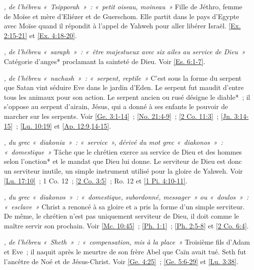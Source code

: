 \begin{multicols}{2}
\textit{, de l'hébreu «~Tsipporah~»~: «~petit oiseau, moineau~»}\newline
Fille de Jéthro, femme de Moïse et mère d'Eliézer et de Guerschom. Elle partit dans le pays d'Egypte avec Moïse quand il répondit à l'appel de Yahweh pour aller libérer Israël. \vref{Ex. 2:15-21} et \vref{Ex. 4:18-20}.

\textit{, de l'hébreu «~saraph~»~: «~être majestueux avec six ailes au service de Dieu~»}\newline
Catégorie d'anges* proclamant la sainteté de Dieu. Voir \vref{Es. 6:1-7}.

\textit{, de l'hébreu «~nachash~»~: «~serpent, reptile~»}\newline
C'est sous la forme du serpent que Satan vint séduire Eve dans le jardin d'Eden. Le serpent fut maudit d'entre tous les animaux pour son action. Le serpent ancien ou rusé désigne le diable*~; il s'oppose au serpent d'airain, Jésus, qui a donné à ses enfants le pouvoir de marcher sur les serpents.\newline
Voir \vref{Ge. 3:1-14}~; \vref{No. 21:4-9}~; \vref{2 Co. 11:3}~; \vref{Jn. 3:14-15}~; \vref{Lu. 10:19} et \vref{Ap. 12:9,14-15}.

\textit{, du grec «~diakonia~»~: «~service~», dérivé du mot grec «~diakonos~»~: «~domestique~»}\newline
Tâche que le chrétien exerce au service de Dieu et des hommes selon l'onction* et le mandat que Dieu lui donne. Le serviteur de Dieu est donc un serviteur inutile, un simple instrument utilisé pour la gloire de Yahweh. Voir \vref{Lu. 17:10}~; 1 Co. 12~; \vref{2 Co. 3:5}~; Ro. 12 et \vref{1 Pi. 4:10-11}.

\textit{, du grec «~diakonos~»~: «~domestique, subordonné, messager~» ou «~doulos~»~: «~esclave~»}\newline
Christ a renoncé à sa gloire et a pris la forme d'un simple serviteur. De même, le chrétien n'est pas uniquement serviteur de Dieu, il doit comme le maître servir son prochain.\newline
Voir \vref{Mc. 10:45}~; \vref{Ph. 1:1}~; \vref{Ph. 2:5-8} et \vref{2 Co. 6:4}.

\textit{, de l'hébreu «~Sheth~»~: «~compensation, mis à la place~»}\newline
Troisième fils d'Adam et Eve~; il naquit après le meurtre de son frère Abel que Caïn avait tué. Seth fut l'ancêtre de Noé et de Jésus-Christ. Voir \vref{Ge. 4:25}~; \vref{Ge. 5:6-29} et \vref{Lu. 3:38}.


\end{multicols}
